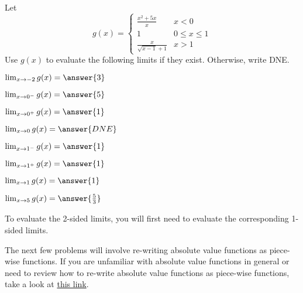 \documentclass[handout]{ximera}
\begin{document}
\begin{exercise}
Let
\[
g(x) = \begin{cases}
  \frac{x^2+5x}{x}  & x<0 \\
  1 & 0 \leq x \leq 1 \\
  \frac{x}{\sqrt{x-1} +1} & x>1
\end{cases}
\]
Use $g(x)$ to evaluate the following limits if they exist.  Otherwise, write DNE.

\begin{itemize}

\begin{multicols}{2}

\item [] $\lim_{x \to -2} g(x) = \answer{3}$

\item [] $\lim_{x \to 0^-} g(x) = \answer{5}$

\item [] $\lim_{x \to 0^+} g(x) = \answer{1}$

\item [] $\lim_{x \to 0} g(x) = \answer{DNE}$

\item [] $\lim_{x \to 1^-} g(x) = \answer{1}$

\item [] $\lim_{x \to 1^+} g(x) = \answer{1}$

\item [] $\lim_{x \to 1} g(x) = \answer{1}$

\item [] $\lim_{x \to 5} g(x) = \answer{\frac{5}{3}}$

\end{multicols}

\end{itemize}

\begin{hint}

To evaluate the 2-sided limits, you will first need to evaluate the corresponding 1-sided limits. 

\end{hint}

\end{exercise}

The next few problems will involve re-writing absolute value functions as piece-wise functions.  If you are unfamiliar with absolute value functions in general or need to review how to re-write absolute value functions as piece-wise functions, take a look at \href{https://ximera.osu.edu/math160fa17/m160prerequisites/PreRequisiteXards/U2CommonFunctions/2.5TheAbsoluteValueFunction/titlePage}{this link}.
\end{document}

